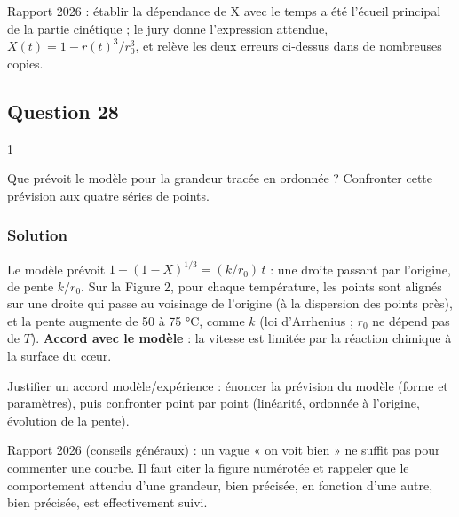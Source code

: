 \documentclass[11pt,a4paper]{article}
\begin{document}
\begin{jury}

Rapport 2026 : établir la dépendance de X avec le temps a été l'écueil principal de la partie cinétique ; le jury donne l'expression attendue, \(X(t)=1-r(t)^3/r_0^3\), et relève les deux erreurs ci-dessus dans de nombreuses copies.

\end{jury}

\hypertarget{question-28}{%
\subsection{Question 28}\label{question-28}}

\begin{indication}{1}

Que prévoit le modèle pour la grandeur tracée en ordonnée ? Confronter cette prévision aux quatre séries de points.

\end{indication}

\hypertarget{solution-27}{%
\subsubsection{Solution}\label{solution-27}}

Le modèle prévoit \(1-(1-X)^{1/3}=(k/r_0)\,t\) : une droite passant par l'origine, de pente \(k/r_0\). Sur la Figure 2, pour chaque température, les points sont alignés sur une droite qui passe au voisinage de l'origine (à la dispersion des points près), et la pente augmente de 50 à 75 °C, comme \(k\) (loi d'Arrhenius ; \(r_0\) ne dépend pas de \(T\)). \textbf{Accord avec le modèle} : la vitesse est limitée par la réaction chimique à la surface du cœur.

\begin{methode}

Justifier un accord modèle/expérience : énoncer la prévision du modèle (forme et paramètres), puis confronter point par point (linéarité, ordonnée à l'origine, évolution de la pente).

\end{methode}

\begin{jury}

Rapport 2026 (conseils généraux) : un vague « on voit bien » ne suffit pas pour commenter une courbe. Il faut citer la figure numérotée et rappeler que le comportement attendu d'une grandeur, bien précisée, en fonction d'une autre, bien précisée, est effectivement suivi.

\end{jury}
\end{document}
